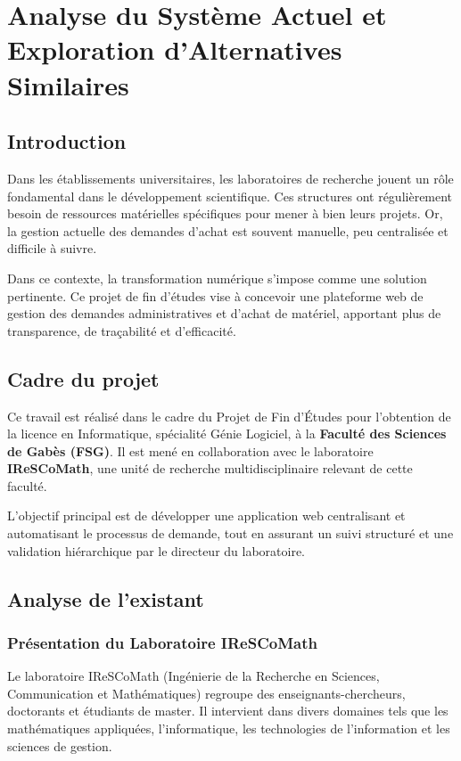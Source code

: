 \chapter{Analyse du Système Actuel et Exploration d'Alternatives Similaires}


\section{Introduction}

Dans les établissements universitaires, les laboratoires de recherche jouent un rôle fondamental dans le développement scientifique. Ces structures ont régulièrement besoin de ressources matérielles spécifiques pour mener à bien leurs projets. Or, la gestion actuelle des demandes d'achat est souvent manuelle, peu centralisée et difficile à suivre.

Dans ce contexte, la transformation numérique s’impose comme une solution pertinente. Ce projet de fin d’études vise à concevoir une plateforme web de gestion des demandes administratives et d’achat de matériel, apportant plus de transparence, de traçabilité et d’efficacité.

\section{Cadre du projet}

Ce travail est réalisé dans le cadre du Projet de Fin d’Études pour l’obtention de la licence en Informatique, spécialité Génie Logiciel, à la \textbf{Faculté des Sciences de Gabès (FSG)}. Il est mené en collaboration avec le laboratoire \textbf{IReSCoMath}, une unité de recherche multidisciplinaire relevant de cette faculté.

L’objectif principal est de développer une application web centralisant et automatisant le processus de demande, tout en assurant un suivi structuré et une validation hiérarchique par le directeur du laboratoire.

\section{Analyse de l’existant}

\subsection{Présentation du Laboratoire IReSCoMath}

Le laboratoire IReSCoMath (Ingénierie de la Recherche en Sciences, Communication et Mathématiques) regroupe des enseignants-chercheurs, doctorants et étudiants de master. Il intervient dans divers domaines tels que les mathématiques appliquées, l’informatique, les technologies de l’information et les sciences de gestion.

